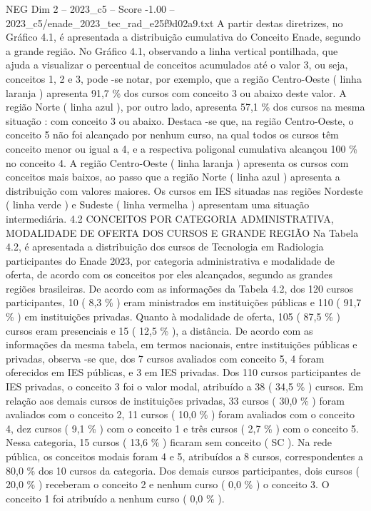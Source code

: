 \begin{textsample}{NEG Dim 2 – 2023\_c5 – Score -1.00 – 2023\_c5/enade\_2023\_tec\_rad\_e25f9d02a9.txt}
A partir destas diretrizes, no Gráfico 4.1, é apresentada a distribuição cumulativa do Conceito Enade, segundo a grande região.
No Gráfico 4.1, observando a linha vertical pontilhada, que ajuda a visualizar o percentual de conceitos acumulados até o valor 3, ou seja, conceitos 1, 2 e 3, pode -se notar, por exemplo, que a região Centro-Oeste ( linha laranja ) apresenta 91,7 \% dos cursos com conceito 3 ou abaixo deste valor.
A região Norte ( linha azul ), por outro lado, apresenta 57,1 \% dos cursos na mesma situação : com conceito 3 ou abaixo.
Destaca -se que, na região Centro-Oeste, o conceito 5 não foi alcançado por nenhum curso, na qual todos os cursos têm conceito menor ou igual a 4, e a respectiva poligonal cumulativa alcançou 100 \% no conceito 4.
A região Centro-Oeste ( linha laranja ) apresenta os cursos com conceitos mais baixos, ao passo que a região Norte ( linha azul ) apresenta a distribuição com valores maiores.
Os cursos em IES situadas nas regiões Nordeste ( linha verde ) e Sudeste ( linha vermelha ) apresentam uma situação intermediária. 4.2 CONCEITOS POR CATEGORIA ADMINISTRATIVA, MODALIDADE DE OFERTA DOS CURSOS E GRANDE REGIÃO Na Tabela 4.2, é apresentada a distribuição dos cursos de Tecnologia em Radiologia participantes do Enade 2023, por categoria administrativa e modalidade de oferta, de acordo com os conceitos por eles alcançados, segundo as grandes regiões brasileiras.
De acordo com as informações da Tabela 4.2, dos 120 cursos participantes, 10 ( 8,3 \% ) eram ministrados em instituições públicas e 110 ( 91,7 \% ) em instituições privadas.
Quanto à modalidade de oferta, 105 ( 87,5 \% ) cursos eram presenciais e 15 ( 12,5 \% ), a distância.
De acordo com as informações da mesma tabela, em termos nacionais, entre instituições públicas e privadas, observa -se que, dos 7 cursos avaliados com conceito 5, 4 foram oferecidos em IES públicas, e 3 em IES privadas.
Dos 110 cursos participantes de IES privadas, o conceito 3 foi o valor modal, atribuído a 38 ( 34,5 \% ) cursos.
Em relação aos demais cursos de instituições privadas, 33 cursos ( 30,0 \% ) foram avaliados com o conceito 2, 11 cursos ( 10,0 \% ) foram avaliados com o conceito 4, dez cursos ( 9,1 \% ) com o conceito 1 e três cursos ( 2,7 \% ) com o conceito 5.
Nessa categoria, 15 cursos ( 13,6 \% ) ficaram sem conceito ( SC ).
Na rede pública, os conceitos modais foram 4 e 5, atribuídos a 8 cursos, correspondentes a 80,0 \% dos 10 cursos da categoria.
Dos demais cursos participantes, dois cursos ( 20,0 \% ) receberam o conceito 2 e nenhum curso ( 0,0 \% ) o conceito 3.
O conceito 1 foi atribuído a nenhum curso ( 0,0 \% ).

\end{textsample}
